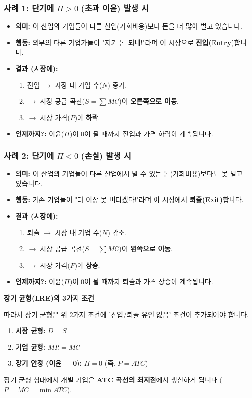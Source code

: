 \documentclass[11pt,a4paper]{book}
\theoremstyle{definition}
\begin{document}
\subsubsection{사례 1: 단기에 $\Pi > 0$ (초과 이윤) 발생 시}
\begin{itemize}
    \item \textbf{의미:} 이 산업의 기업들이 다른 산업(기회비용)보다 돈을 더 많이 벌고 있습니다.
    \item \textbf{행동:} 외부의 다른 기업가들이 "저기 돈 되네!"라며 이 시장으로 \textbf{진입(Entry)}합니다.
    \item \textbf{결과 (시장에):}
    \begin{enumerate}
        \item 진입 $\to$ 시장 내 기업 수($N$) 증가.
        \item $\to$ 시장 공급 곡선($S = \sum MC$)이 \textbf{오른쪽으로 이동}.
        \item $\to$ 시장 가격($P$)이 \textbf{하락}.
    \end{enumerate}
    \item \textbf{언제까지?:} 이윤($\Pi$)이 0이 될 때까지 진입과 가격 하락이 계속됩니다.
\end{itemize}

\subsubsection{사례 2: 단기에 $\Pi < 0$ (손실) 발생 시}
\begin{itemize}
    \item \textbf{의미:} 이 산업의 기업들이 다른 산업에서 벌 수 있는 돈(기회비용)보다도 못 벌고 있습니다.
    \item \textbf{행동:} 기존 기업들이 "더 이상 못 버티겠다!"라며 이 시장에서 \textbf{퇴출(Exit)}합니다.
    \item \textbf{결과 (시장에):}
    \begin{enumerate}
        \item 퇴출 $\to$ 시장 내 기업 수($N$) 감소.
        \item $\to$ 시장 공급 곡선($S = \sum MC$)이 \textbf{왼쪽으로 이동}.
        \item $\to$ 시장 가격($P$)이 \textbf{상승}.
    \end{enumerate}
    \item \textbf{언제까지?:} 이윤($\Pi$)이 0이 될 때까지 퇴출과 가격 상승이 계속됩니다.
\end{itemize}

\begin{summarybox}
\textbf{장기 균형(LRE)의 3가지 조건}

따라서 장기 균형은 위 2가지 조건에 '진입/퇴출 유인 없음' 조건이 추가되어야 합니다.
\begin{enumerate}
    \item \textbf{시장 균형:} $D = S$
    \item \textbf{기업 균형:} $MR = MC$
    \item \textbf{장기 안정 (이윤 = 0):} $\Pi = 0$ (즉, $P = ATC$)
\end{enumerate}
장기 균형 상태에서 개별 기업은 \textbf{ATC 곡선의 최저점}에서 생산하게 됩니다 ($P = MC = \min ATC$).
\end{summarybox}
\end{document}
